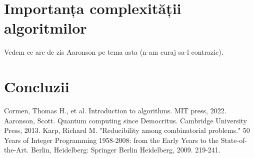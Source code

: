 \documentclass{article}
\begin{document}
\section{Importanța complexității algoritmilor}
Vedem ce are de zis Aaronson pe tema asta (n-am curaj sa-l contrazic).

\section{Concluzii}

\begin{thebibliography}{ }
	Cormen, Thomas H., et al. Introduction to algorithms. MIT press, 2022.
	Aaronson, Scott. Quantum computing since Democritus. Cambridge University Press, 2013.
	Karp, Richard M. "Reducibility among combinatorial problems." 50 Years of Integer Programming 1958-2008: from the Early Years to the State-of-the-Art. Berlin, Heidelberg: Springer Berlin Heidelberg, 2009. 219-241.
\end{thebibliography}
\end{document}
